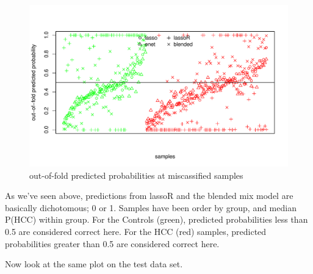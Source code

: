 \documentclass[
]{book}
\begin{document}
\begin{figure}
\centering
\includegraphics{Static/figures/misclassTrain-1.pdf}
\caption{\label{fig:misclassTrain}out-of-fold predicted probabilities at miscassified samples}
\end{figure}

As we've seen above, predictions from lassoR and the blended mix model
are basically dichotomous; 0 or 1. Samples have been order by group, and
median P(HCC) within group. For the Controls (green), predicted probabilities
less than 0.5 are considered correct here. For the HCC (red) samples,
predicted probabilities greater than 0.5 are considered correct here.

Now look at the same plot on the test data set.
\end{document}
